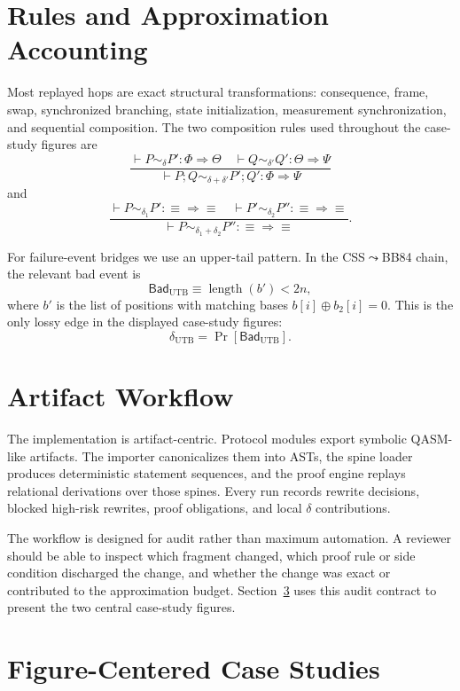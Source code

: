 \section{Rules and Approximation Accounting}
\label{sec:assert-rules}

Most replayed hops are exact structural transformations: consequence, frame, swap, synchronized branching, state initialization, measurement synchronization, and sequential composition. The two composition rules used throughout the case-study figures are
\[
\frac{
\vdash P\sim_{\delta}P':\Phi\Longrightarrow\Theta
\quad
\vdash Q\sim_{\delta'}Q':\Theta\Longrightarrow\Psi}
{\vdash P;Q\sim_{\delta+\delta'}P';Q':\Phi\Longrightarrow\Psi}
\]
and
\[
\frac{
\vdash P\sim_{\delta_1}P':\equiv\Longrightarrow\equiv
\quad
\vdash P'\sim_{\delta_2}P'':\equiv\Longrightarrow\equiv}
{\vdash P\sim_{\delta_1+\delta_2}P'':\equiv\Longrightarrow\equiv}.
\]

For failure-event bridges we use an upper-tail pattern. In the CSS$\leadsto$BB84 chain, the relevant bad event is
\[
\mathsf{Bad}_{\mathrm{UTB}}\equiv \operatorname{length}(b')<2n,
\]
where $b'$ is the list of positions with matching bases $b[i]\oplus b_2[i]=0$. This is the only lossy edge in the displayed case-study figures:
\[
\delta_{\mathrm{UTB}}=\Pr[\mathsf{Bad}_{\mathrm{UTB}}].
\]

\section{Artifact Workflow}
\label{sec:workflow}

The implementation is artifact-centric. Protocol modules export symbolic QASM-like artifacts. The importer canonicalizes them into ASTs, the spine loader produces deterministic statement sequences, and the proof engine replays relational derivations over those spines. Every run records rewrite decisions, blocked high-risk rewrites, proof obligations, and local $\delta$ contributions.

The workflow is designed for audit rather than maximum automation. A reviewer should be able to inspect which fragment changed, which proof rule or side condition discharged the change, and whether the change was exact or contributed to the approximation budget. Section~\ref{sec:evaluation} uses this audit contract to present the two central case-study figures.

\section{Figure-Centered Case Studies}
\label{sec:evaluation}

